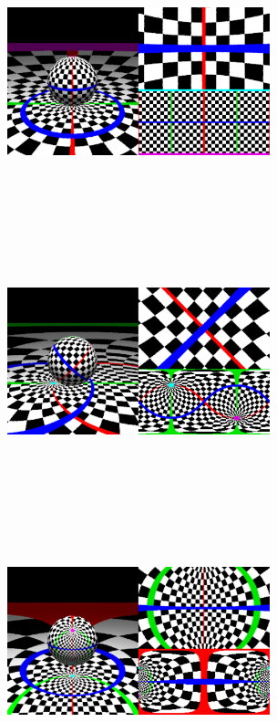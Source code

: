 \begin{figure}[htbp]
 \begin{minipage}{0.5\hsize}
  \center
  \includegraphics[width=3in, height=3in, keepaspectratio]{../img/klein/spherical.pdf}
  \label{fig:sphericalStandard}
 \end{minipage}
 \begin{minipage}{0.5\hsize}
  \center
  \includegraphics[width=3in, height=3in, keepaspectratio]{../img/klein/sphericalRotation.pdf}
  \label{fig:sphericalRotation}
 \end{minipage}
 \begin{minipage}{0.5\hsize}
  \center
  \includegraphics[width=3in, height=3in, keepaspectratio]{../img/klein/sphericalTranslation.pdf}

\end{minipage}
\end{figure}
